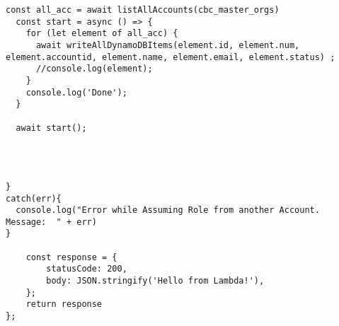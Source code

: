 \begin{lstlisting}[caption={Lambda-Code in NodeJS},
label=lst:Beispielcode 1,basicstyle=\ttfamily\small ]
  const all_acc = await listAllAccounts(cbc_master_orgs)
  const start = async () => {
    for (let element of all_acc) {
      await writeAllDynamoDBItems(element.id, element.num, element.accountid, element.name, element.email, element.status) ;
      //console.log(element);
    }
    console.log('Done');
  }

  await start();




}
catch(err){
  console.log("Error while Assuming Role from another Account. Message:  " + err)
}

    const response = {
        statusCode: 200,
        body: JSON.stringify('Hello from Lambda!'),
    };
    return response
};

\end{lstlisting}

